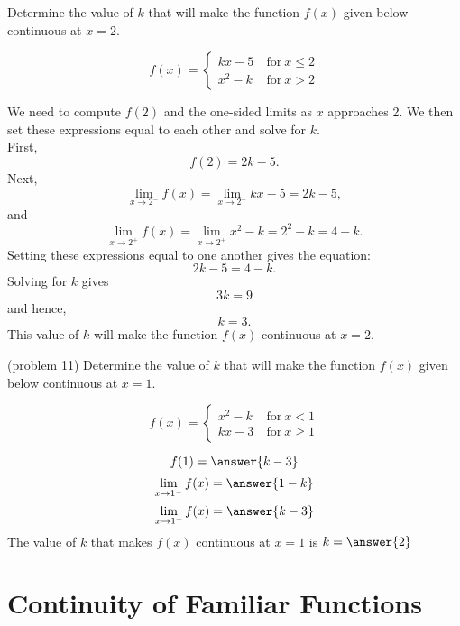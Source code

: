 \documentclass[handout]{ximera}
\begin{document}
\begin{example}[example 11]
Determine the value of $k$ that will make the function $f(x)$ given below 
continuous at $x = 2$.
 
\[f(x) = \left\{
     \begin{array}{lr}
       kx-5 & \ \text{for} \  x \leq 2 \\
			 x^2 - k & \ \text{for} \ x > 2
     \end{array}
   \right.
\]

We need to  compute $f(2)$ and the one-sided limits as $x$ approaches 2.
We then set these expressions equal to each other and solve for $k$.\\
First,
\[
f(2) = 2k-5.
\]
Next,
\[
\lim_{x \to 2^-} f(x) = \lim_{x \to 2^-} kx-5 = 2k-5,
\]
and
\[
\lim_{x \to 2^+} f(x) = \lim_{x \to 2^+} x^2 - k = 2^2 - k = 4 - k.
\]
Setting these expressions equal to one another gives the equation:
\[2k - 5 = 4 - k.\]
Solving for $k$ gives
\[3k = 9\]
and hence,
\[k = 3.\]
This value of $k$ will make the function $f(x)$ continuous at $x=2$.
\end{example}

\begin{problem}(problem 11)
Determine the value of $k$ that will make the function $f(x)$ given below 
continuous at $x = 1$.
 
\[f(x) = \left\{
     \begin{array}{lr}
        x^2 - k & \ \text{for} \  x < 1 \\
			 kx-3 & \ \text{for} \ x \geq 1
     \end{array}
   \right.
\]

\[
f(1) = \answer{k-3}
\]
\[
\lim_{x \to 1^-} f(x) = \answer{1-k}
\]
\[
\lim_{x \to 1^+} f(x) = \answer{k-3}
\]
The value of $k$ that makes $f(x)$ continuous at $x = 1$ is
$k = \answer{2}$
\end{problem}


\section{Continuity of Familiar Functions}
\end{document}
